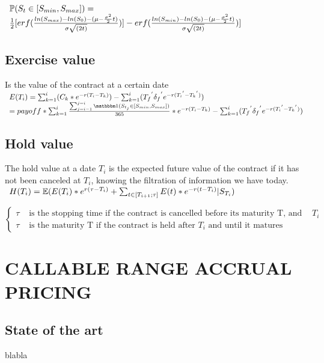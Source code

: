 \documentclass[12pt]{article}
\begin{document}
 					$\begin{array}{lcl}
 					\mathbb{P}(S_t \in [S_{min},S_{max}]) =\\ \frac{1}{2}[erf(\frac{ln(S_{max})-ln(S_0)-(\mu-\frac{\sigma^2}{2}t)}{\sigma \sqrt{(2t)}})]-erf(\frac{ln(S_{min})-ln(S_0)-(\mu-\frac{\sigma^2}{2}t)}{\sigma \sqrt{(2t)}})]
 					\end{array}$
	 	\subsection{Exercise value}
	 	
		 	Is the value of the contract at a certain date\\
		 	$\begin{array}{lcl}
			 	E(T_i) = \sum_{k = 1}^{i} (C_k * e^{-r(T_i - T_k)}) -  \sum_{k = 1}^{i} ({T_f}^{'} {\delta_f}^{'} e^{-r({T_i}^{'} - {T_k}^{'})})\\
			 	=payoff * \sum_{k=1}^{i}\frac{\sum_{j=i - 1}^{j=i}\indicator (S_{t_j} \in [S_{min},S_{max}])}{365} * e^{-r(T_i - T_k)} -  \sum_{k = 1}^{i} ({T_f}^{'} {\delta_f}^{'} e^{-r({T_i}^{'} - {T_k}^{'})})
		 	\end{array}$
		 	
		 	
	 	\subsection{Hold value}
	 	The hold value at a date $T_i$ is the expected future value of the contract if it has not been canceled at $T_i$, knowing the filtration of information we have today.
	 	$\begin{array}{lcl}
		 	H(T_i) = \mathbb{E}(E(T_{i}) * e^{r(\tau-T_i)} + \sum_{t \in[T_{i+1}; \tau ]}E(t)*e^{-r(t - T_i)}|S_{T_i})
	 	\end{array}$
	 	
	 	$$
		\left\{
		 	\begin{array}{ll}
		 	\tau & \mbox{ is the stopping time if the contract is cancelled before its maturity T, and after $T_i$} \\
		 	\tau & \mbox{ is the maturity T if the contract is held after $T_i$  and until it matures}
		 	\end{array}
	\right.
	 	$$
	\section{CALLABLE RANGE ACCRUAL PRICING}
	\subsection{State of the art}
	blabla
\end{document}
